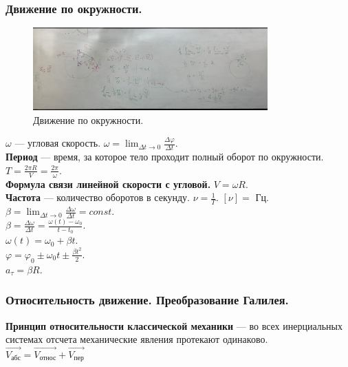 \documentclass{article}
\begin{document}
	\subsubsection{Движение по окружности.}
	\begin{figure}[H]
		\includegraphics[height=120px]{extra-materials/Скорости_Вектора_3}
		\caption{Движение по окружности.}
	\end{figure}
	$\omega$ --- угловая скорость. $\omega = \lim_{\varDelta t \rightarrow 0} \frac{\varDelta \varphi}{\varDelta t}$. \\
	\textbf{Период} --- время, за которое тело проходит полный оборот по окружности. $T = \frac{2\pi R}{V} = \frac{2\pi}{\omega}$. \\
	\textbf{Формула связи линейной скорости с угловой.} $V = \omega R$. \\
	\textbf{Частота} --- количество оборотов в секунду. $\nu = \frac{1}{T}$. $[\nu] = $ Гц. \\
	$\beta = \lim_{\varDelta t \rightarrow 0} \frac{\varDelta \omega}{\varDelta t} = const$. \\
	$\beta = \frac{\varDelta \omega}{\varDelta t} = \frac{\omega(t) - \omega_0}{t - t_0}$. \\
	$\omega(t) = \omega_0 + \beta t$. \\
	$\varphi = \varphi_0 \pm \omega_0t \pm \frac{\beta t^2}{2}$. \\
	$a_{\tau} = \beta R$.
	\subsubsection{Относительность движение. Преобразование Галилея.}
	\textbf{Принцип относительности классической механики} --- во всех инерциальных системах отсчета механические явления протекают одинаково. \\
	$\vec{V_{\text{абс}}} = \vec{V_{\text{относ}}} + \vec{V_{\text{пер}}}$
\end{document}
